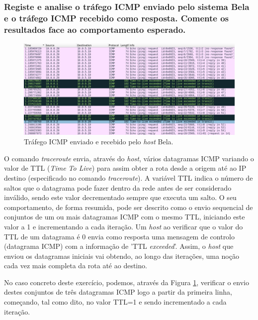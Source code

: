 %
%
\subsubsection{Registe e analise o tráfego ICMP enviado pelo sistema Bela e o tráfego ICMP recebido como resposta. Comente os resultados face ao comportamento esperado.}



\begin{figure}[H]
\centering
\includegraphics[width=\linewidth]{images/ParteI/Questao1/questao1-wireshark.jpg}
\caption{Tráfego ICMP enviado e recebido pelo \textit{host} Bela.} \label{1-wireshark}
\end{figure}

    O comando \textit{traceroute} envia, através do \textit{host}, vários datagramas ICMP variando o valor de TTL (\textit{Time To Live}) para assim obter a rota desde a origem até ao IP destino (especificado no comando \textit{traceroute}). A variável TTL indica o número de saltos que o datagrama pode fazer dentro da rede antes de ser considerado inválido, sendo este valor decrementado sempre que executa um salto. O seu comportamento, de forma resumida, pode ser descrito como o envio sequencial de conjuntos de um ou mais datagramas ICMP com o mesmo TTL, iniciando este valor a 1 e incrementando a cada iteração. Um \textit{host} ao verificar que o valor do TTL de um datagrama é 0 envia como resposta uma mensagem de controlo (datagrama ICMP) com a informação de 'TTL \textit{exceeded}'. Assim, o \textit{host} que enviou os datagramas iniciais vai obtendo, ao longo das iterações, uma noção cada vez mais completa da rota até ao destino.
    
    \par No caso concreto deste exercício, podemos, através da Figura \ref{1-wireshark}, verificar o envio destes conjuntos de três datagramas ICMP logo a partir da primeira linha, começando, tal como dito, no valor TTL=1 e sendo incrementado a cada iteração.
    
